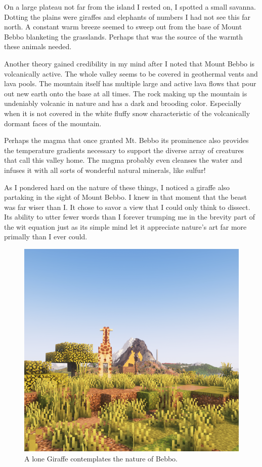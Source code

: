 On a large plateau not far from the island I rested on, I spotted a small savanna. Dotting the plains were giraffes and elephants of numbers I had not see this far north. A constant warm breeze seemed to sweep out from the base of Mount Bebbo blanketing the grasslands. Perhaps that was the source of the warmth these animals needed.

Another theory gained credibility in my mind after I noted that Mount Bebbo is volcanically active. The whole valley seems to be covered in geothermal vents and lava pools. The mountain itself has multiple large and active lava flows that pour out new earth onto the base at all times. The rock making up the mountain is undeniably volcanic in nature and has a dark and brooding color. Especially when it is not covered in the white fluffy snow characteristic of the volcanically dormant faces of the mountain.

Perhaps the magma that once granted Mt. Bebbo its prominence also provides the temperature gradients necessary to support the diverse array of creatures that call this valley home. The magma probably even cleanses the water and infuses it with all sorts of wonderful natural minerals, like sulfur!

As I pondered hard on the nature of these things, I noticed a giraffe also partaking in the sight of Mount Bebbo. I knew in that moment that the beast was far wiser than I. It chose to savor a view that I could only think to dissect. Its ability to utter fewer words than I forever trumping me in the brevity part of the wit equation just as its simple mind let it appreciate nature's art far more primally than I ever could. 

\begin{figure}
    \centering
    \includegraphics[width=.9\linewidth]{Giraffe Ponders Bebbo.png}
    \caption{A lone Giraffe contemplates the nature of Bebbo.}
\end{figure}

